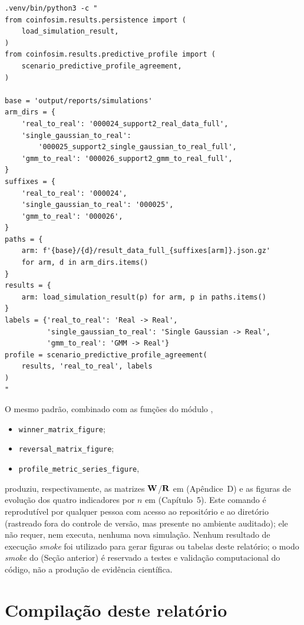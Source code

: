 \begin{verbatim}
.venv/bin/python3 -c "
from coinfosim.results.persistence import (
    load_simulation_result,
)
from coinfosim.results.predictive_profile import (
    scenario_predictive_profile_agreement,
)

base = 'output/reports/simulations'
arm_dirs = {
    'real_to_real': '000024_support2_real_data_full',
    'single_gaussian_to_real':
        '000025_support2_single_gaussian_to_real_full',
    'gmm_to_real': '000026_support2_gmm_to_real_full',
}
suffixes = {
    'real_to_real': '000024',
    'single_gaussian_to_real': '000025',
    'gmm_to_real': '000026',
}
paths = {
    arm: f'{base}/{d}/result_data_full_{suffixes[arm]}.json.gz'
    for arm, d in arm_dirs.items()
}
results = {
    arm: load_simulation_result(p) for arm, p in paths.items()
}
labels = {'real_to_real': 'Real -> Real',
          'single_gaussian_to_real': 'Single Gaussian -> Real',
          'gmm_to_real': 'GMM -> Real'}
profile = scenario_predictive_profile_agreement(
    results, 'real_to_real', labels
)
"
\end{verbatim}

O mesmo padrão, combinado com as funções do módulo
,

\begin{itemize}
  \item \texttt{winner\_matrix\_figure};
  \item \texttt{reversal\_matrix\_figure};
  \item \texttt{profile\_metric\_series\_figure},
\end{itemize}

\noindent produziu, respectivamente, as matrizes $\mathbf{W}$/$\mathbf{R}$ em  (Apêndice~D) e as figuras de evolução dos quatro indicadores por $n$ em  (Capítulo~5). Este comando é reprodutível por qualquer pessoa com acesso ao repositório e ao diretório  (rastreado fora do controle de versão, mas presente no ambiente auditado); ele não requer, nem executa, nenhuma nova simulação. Nenhum resultado de execução \textit{smoke} foi utilizado para gerar figuras ou tabelas deste relatório; o modo \textit{smoke} do \CoInfoSim{} (Seção anterior) é reservado a testes e validação computacional do código, não a produção de evidência científica.

\section{Compilação deste relatório}

